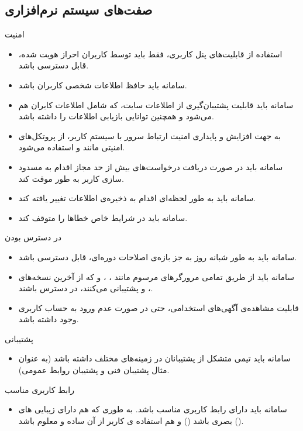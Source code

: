 \documentclass[12pt,svgnames,oneside]{book}
\newcounter{itemadded}
\let\LaTeXStandardEnumerateBegin\enumerate
\let\LaTeXStandardEnumerateEnd\endenumerate
\renewenvironment{enumerate}{%
	\LaTeXStandardEnumerateBegin%
	\setcounter{itemadded}{0}
}{%
	\LaTeXStandardEnumerateEnd%
}%
\begin{document}
		\subsection{صفت‌های سیستم‌ نرم‌افزاری}
			\begin{enumerate}
				\item امنیت
					\begin{itemize}
						\item							استفاده از قابلیت‌های پنل کاربری، فقط باید توسط کاربران احراز هویت شده، قابل دسترسی باشد.
							\item							سامانه باید حافظ اطلاعات شخصی کاربران باشد.
							\item							سامانه باید قابلیت پشتیبان‌گیری از اطلاعات سایت، که شامل اطلاعات کابران هم می‌شود و همچنین توانایی بازیابی اطلاعات را داشته باشد.
							\item							به جهت افزایش و پایداری امنیت ارتباط سرور با سیستم کاربر، از پروتکل‌های امنیتی مانند  و  استفاده می‌شود.
							\item							سامانه باید در صورت دریافت درخواست‌های بیش از حد مجاز اقدام به مسدود سازی کاربر به طور موقت کند.
							\item							سامانه باید به طور لحظه‌ای اقدام به ذخیره‌ی اطلاعات تغییر یافته کند.
							\item							سامانه باید در شرایط خاص خطاها را متوقف کند.
						\end{itemize}

				\item در دسترس بودن
						\begin{itemize}
							\item
							سامانه باید به طور شبانه روز به جز بازه‌ی اصلاحات دوره‌ای، قابل دسترسی باشد.
							\item
							سامانه باید از طریق تمامی مرورگر‌های مرسوم مانند
							،
							،
							و
							که از آخرین نسخه‌های
							،
							و
							پشتیبانی می‌کنند، در دسترس باشند.
							\item
							قابلیت مشاهده‌ی آگهی‌های استخدامی، حتی در صورت عدم ورود به حساب کاربری وجود داشته باشد.
						\end{itemize}

					\item پشتیبانی
						\begin{itemize}
							\item
							سامانه باید تیمی متشکل از پشتیبانان در زمینه‌های مختلف داشته باشد (به عنوان مثال پشتیبان فنی و پشتیبان روابط عمومی).
						\end{itemize}

					\item رابط کاربری مناسب
						\begin{itemize}
							\item
							سامانه باید دارای رابط کاربری مناسب باشد. به طوری که هم دارای زیبایی های بصری باشد () و هم استفاده ی کاربر از آن ساده و معلوم باشد ().
						\end{itemize}
				\end{enumerate}
\end{document}

